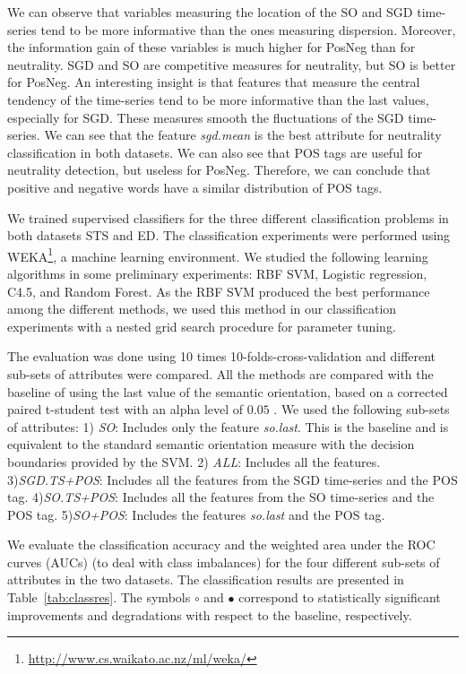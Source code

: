 \documentclass{sig-alternate}
\begin{document}
We can observe that variables measuring the location of the SO and SGD time-series tend to be more informative than the ones measuring dispersion. Moreover, the information gain of these variables is much higher for PosNeg than for neutrality. SGD and SO are competitive measures for neutrality, but SO is better for PosNeg. An interesting insight is that features that measure the central tendency of the time-series tend to be more informative than the last values, especially for SGD. These measures smooth the fluctuations of the SGD time-series. We can see that the feature \emph{sgd.mean} is the best attribute for neutrality classification in both datasets. We can also see that POS tags are useful for neutrality detection, but useless for PosNeg. Therefore, we can conclude that positive and negative words have a similar distribution of POS tags. 

We trained supervised classifiers for the three different classification problems in both datasets STS and ED. The classification experiments were performed using WEKA\footnote{\url{http://www.cs.waikato.ac.nz/ml/weka/}}, a machine learning environment. We studied the following learning algorithms in some preliminary experiments: RBF SVM, Logistic regression, C4.5, and Random Forest. As the RBF SVM produced the best performance among the different methods, we used this method in our  classification experiments with a nested grid search procedure for parameter tuning. 

The evaluation was done using 10 times 10-folds-cross-validation and different sub-sets of attributes were compared.  All the methods are compared with the baseline of using the last value of the semantic orientation, based on a corrected paired t-student test with an alpha level of $0.05$ \cite{nadeau2003inference}.  We used the following  sub-sets of attributes: 1) \emph{SO}: Includes only the feature \emph{so.last}. This is the baseline and is equivalent to the standard semantic orientation measure with the decision boundaries provided by the SVM. 2) \emph{ALL}: Includes all the features. 3)\emph{SGD.TS+POS}: Includes all the features from the SGD time-series and the POS tag. 4)\emph{SO.TS+POS}: Includes all the features from the SO time-series and the POS tag. 5)\emph{SO+POS}: Includes the features \emph{so.last} and the POS tag.

We evaluate the classification accuracy and the weighted area under the ROC curves (AUCs) (to deal with class imbalances) for the four different sub-sets of attributes in the two datasets.  The classification results are presented in Table~\ref{tab:classres}. The symbols $\circ$ and $\bullet$ correspond to statistically significant improvements and degradations with respect to the baseline, respectively.
\end{document}
